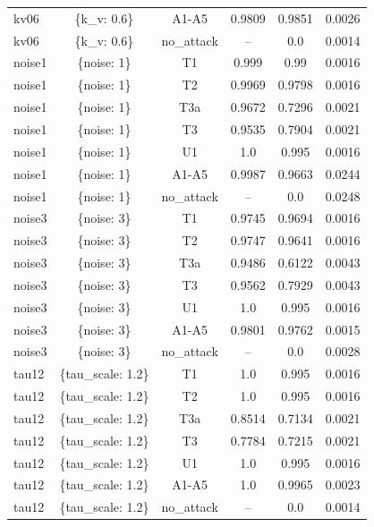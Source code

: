 \begin{tabular}{lccccc}
kv06 & \{k\_v: 0.6\} & A1-A5 & 0.9809 & 0.9851 & 0.0026 \\
kv06 & \{k\_v: 0.6\} & no\_attack & -- & 0.0 & 0.0014 \\
noise1 & \{noise: 1\} & T1 & 0.999 & 0.99 & 0.0016 \\
noise1 & \{noise: 1\} & T2 & 0.9969 & 0.9798 & 0.0016 \\
noise1 & \{noise: 1\} & T3a & 0.9672 & 0.7296 & 0.0021 \\
noise1 & \{noise: 1\} & T3 & 0.9535 & 0.7904 & 0.0021 \\
noise1 & \{noise: 1\} & U1 & 1.0 & 0.995 & 0.0016 \\
noise1 & \{noise: 1\} & A1-A5 & 0.9987 & 0.9663 & 0.0244 \\
noise1 & \{noise: 1\} & no\_attack & -- & 0.0 & 0.0248 \\
noise3 & \{noise: 3\} & T1 & 0.9745 & 0.9694 & 0.0016 \\
noise3 & \{noise: 3\} & T2 & 0.9747 & 0.9641 & 0.0016 \\
noise3 & \{noise: 3\} & T3a & 0.9486 & 0.6122 & 0.0043 \\
noise3 & \{noise: 3\} & T3 & 0.9562 & 0.7929 & 0.0043 \\
noise3 & \{noise: 3\} & U1 & 1.0 & 0.995 & 0.0016 \\
noise3 & \{noise: 3\} & A1-A5 & 0.9801 & 0.9762 & 0.0015 \\
noise3 & \{noise: 3\} & no\_attack & -- & 0.0 & 0.0028 \\
tau12 & \{tau\_scale: 1.2\} & T1 & 1.0 & 0.995 & 0.0016 \\
tau12 & \{tau\_scale: 1.2\} & T2 & 1.0 & 0.995 & 0.0016 \\
tau12 & \{tau\_scale: 1.2\} & T3a & 0.8514 & 0.7134 & 0.0021 \\
tau12 & \{tau\_scale: 1.2\} & T3 & 0.7784 & 0.7215 & 0.0021 \\
tau12 & \{tau\_scale: 1.2\} & U1 & 1.0 & 0.995 & 0.0016 \\
tau12 & \{tau\_scale: 1.2\} & A1-A5 & 1.0 & 0.9965 & 0.0023 \\
tau12 & \{tau\_scale: 1.2\} & no\_attack & -- & 0.0 & 0.0014 \\
\hline
\end{tabular}
